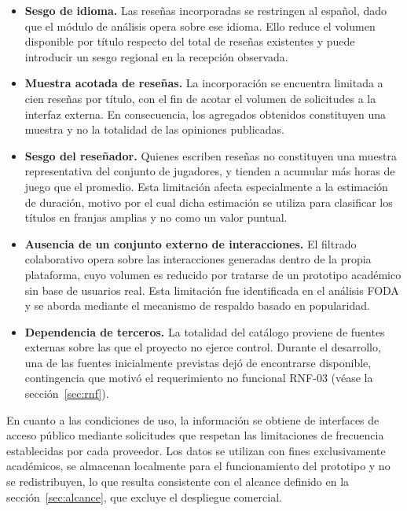 \begin{itemize}
	\item \textbf{Sesgo de idioma.} Las reseñas incorporadas se restringen al español, dado que el módulo de análisis opera sobre ese idioma. Ello reduce el volumen disponible por título respecto del total de reseñas existentes y puede introducir un sesgo regional en la recepción observada.
	\item \textbf{Muestra acotada de reseñas.} La incorporación se encuentra limitada a cien reseñas por título, con el fin de acotar el volumen de solicitudes a la interfaz externa. En consecuencia, los agregados obtenidos constituyen una muestra y no la totalidad de las opiniones publicadas.
	\item \textbf{Sesgo del reseñador.} Quienes escriben reseñas no constituyen una muestra representativa del conjunto de jugadores, y tienden a acumular más horas de juego que el promedio. Esta limitación afecta especialmente a la estimación de duración, motivo por el cual dicha estimación se utiliza para clasificar los títulos en franjas amplias y no como un valor puntual.
	\item \textbf{Ausencia de un conjunto externo de interacciones.} El filtrado colaborativo opera sobre las interacciones generadas dentro de la propia plataforma, cuyo volumen es reducido por tratarse de un prototipo académico sin base de usuarios real. Esta limitación fue identificada en el análisis FODA y se aborda mediante el mecanismo de respaldo basado en popularidad.
	\item \textbf{Dependencia de terceros.} La totalidad del catálogo proviene de fuentes externas sobre las que el proyecto no ejerce control. Durante el desarrollo, una de las fuentes inicialmente previstas dejó de encontrarse disponible, contingencia que motivó el requerimiento no funcional RNF-03 (véase la sección~\ref{sec:rnf}).
\end{itemize}

En cuanto a las condiciones de uso, la información se obtiene de interfaces de acceso público mediante solicitudes que respetan las limitaciones de frecuencia establecidas por cada proveedor. Los datos se utilizan con fines exclusivamente académicos, se almacenan localmente para el funcionamiento del prototipo y no se redistribuyen, lo que resulta consistente con el alcance definido en la sección~\ref{sec:alcance}, que excluye el despliegue comercial.
